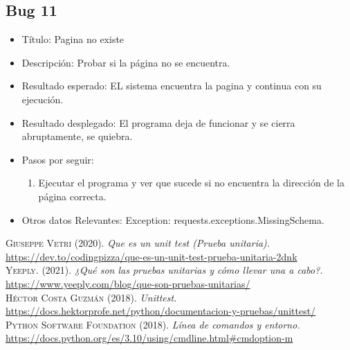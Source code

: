 \documentclass[conference]{IEEEtran}
\begin{document}
\subsection*{Bug 11}
\begin{itemize}
\item Título: Pagina no existe

\item Descripción: Probar si la página no se encuentra.

\item Resultado esperado: EL sistema encuentra la pagina y continua con su ejecución.

\item Resultado desplegado: El programa deja de funcionar y se cierra abruptamente, se quiebra. 

\item Pasos por seguir: 
\begin{enumerate}
\item Ejecutar el programa y ver que sucede si no encuentra la dirección de la página correcta.
\end{enumerate}
\item Otros datos Relevantes: Exception: requests.exceptions.MissingSchema.

\end{itemize}





\normalsize

\begin{thebibliography}{}


 \textsc{Giuseppe Vetri} (2020). \textit{Que es un unit test (Prueba unitaria).} \url{https://dev.to/codingpizza/que-es-un-unit-test-prueba-unitaria-2dnk}\\

 \textsc{Yeeply.} (2021). \textit{¿Qué son las pruebas unitarias y cómo llevar una a cabo?.} \url{https://www.yeeply.com/blog/que-son-pruebas-unitarias/} \\

 \textsc{Héctor Costa Guzmán} (2018). \textit{Unittest.} \url{https://docs.hektorprofe.net/python/documentacion-y-pruebas/unittest/} \\

 \textsc{Python Software Foundation} (2018). \textit{Línea de comandos y entorno.} \url{https://docs.python.org/es/3.10/using/cmdline.html#cmdoption-m} \\



\end{thebibliography}
\end{document}
